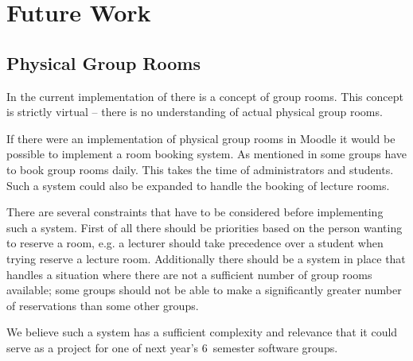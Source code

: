 \chapter{Future Work}
\label{chap:futurework}


\section{Physical Group Rooms}
\label{sec:booking}
In the current implementation of \system{} there is a concept of group rooms.
This concept is strictly virtual -- there is no understanding of actual physical group rooms.

If there were an implementation of physical group rooms in Moodle it would be possible to implement a room booking system.
As mentioned in  some groups have to book group rooms daily.
This takes the time of administrators and students.
Such a system could also be expanded to handle the booking of lecture rooms.

There are several constraints that have to be considered before implementing such a system.
First of all there should be priorities based on the person wanting to reserve a room, e.g. a lecturer should take precedence over a student when trying reserve a lecture room.
Additionally there should be a system in place that handles a situation where there are not a sufficient number of group rooms available; some groups should not be able to make a significantly greater number of reservations than some other groups.

We believe such a system has a sufficient complexity and relevance that it could serve as a project for one of next year's $6$\ths~semester software groups.


